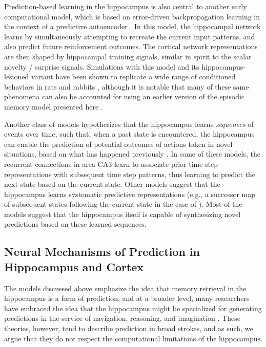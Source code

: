 \documentclass[10pt,letterpaper]{article}
\begin{document}
Prediction-based learning in the hippocampus is also central to another early computational model, which is based on error-driven backpropagation learning in the context of a predictive autoencoder \cite{MyersGluck95}.  In this model, the hippocampal network learns by simultaneously attempting to recreate the current input patterns, and also predict future reinforcement outcomes.  The cortical network representations are then shaped by hippocampal training signals, similar in spirit to the scalar novelty / surprise signals.  Simulations with this model and its hippocampus-lesioned variant have been shown to replicate a wide range of conditioned behaviors in rats and rabbits \cite{GluckMyers94}, although it is notable that many of these same phenomena can also be accounted for using an earlier version of the episodic memory model presented here \cite{OReillyRudy01}. 

Another class of models hypothesizes that the hippocampus learns \emph{sequences} of events over time, such that, when a past state is encountered, the hippocampus can enable the prediction of potential outcomes of actions taken in novel situations, based on what has happened previously \cite{Levy96,WallensteinHasselmo97,JensenLisman96,TsodyksSkaggsSejnowskiEtAl96,Rolls13,SchapiroTurk-BrowneBotvinickEtAl17,StachenfeldBotvinickGershman17}. In some of these models, the recurrent connections in area CA3 learn to associate prior time step representations with subsequent time step patterns, thus learning to predict the next state based on the current state.  Other models suggest that the hippocampus learns systematic predictive representations (e.g., a successor map of subsequent states following the current state in the case of \cite{StachenfeldBotvinickGershman17}).  Most of the models suggest that the hippocampus itself is capable of synthesizing novel predictions based on these learned sequences. 

\subsection*{Neural Mechanisms of Prediction in Hippocampus and Cortex}

The models discussed above emphasize the idea that memory retrieval in the hippocampus is a form of prediction, and at a broader level, many researchers have embraced the idea that the hippocampus might be specialized for generating predictions in the service of navigation, reasoning, and imagination \cite{Buckner10,DavachiDuBrow15,KokTurk-Browne18,Mizumori13,LismanRedish09,ZeithamovaSchlichtingPreston12,MackLovePreston18,ZeithamovaSchlichtingPreston12,JungLeeJeongEtAl18}. These theories, however, tend to describe prediction in broad strokes, and as such, we argue that they do not respect the computational limitations of the hippocampus.
\end{document}
